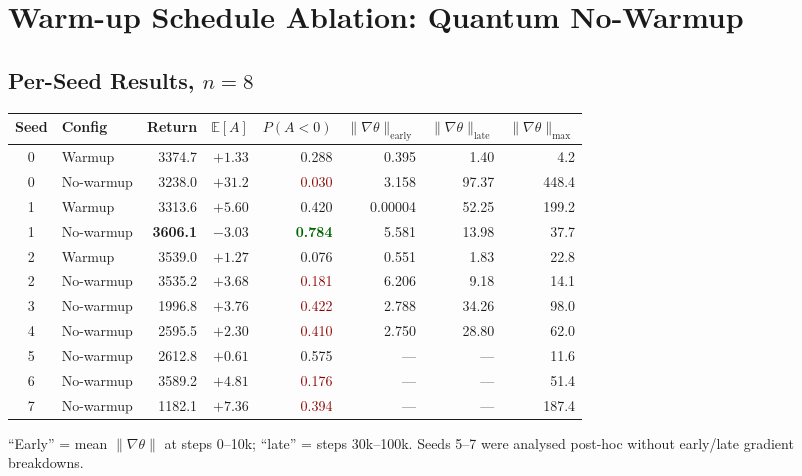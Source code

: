 \documentclass[10pt,a4paper]{article}
\begin{document}
\section{Warm-up Schedule Ablation: Quantum No-Warmup}

\subsection{Per-Seed Results, $n=8$}

\begin{center}
\setlength{\tabcolsep}{5pt}
\begin{tabular}{clrrrrrr}
\toprule
\textbf{Seed} & \textbf{Config} & \textbf{Return} & $\mathbb{E}[A]$
  & $P(A{<}0)$ & $\|\nabla\theta\|_\text{early}$
  & $\|\nabla\theta\|_\text{late}$ & $\|\nabla\theta\|_\text{max}$ \\
\midrule
0 & Warmup    & 3374.7 & $+1.33$ & 0.288
  & 0.395 &  1.40 &   4.2 \\
0 & No-warmup & 3238.0 & $+31.2$ & \textcolor{darkred}{0.030}
  & 3.158 & 97.37 & 448.4 \\
\midrule
1 & Warmup    & 3313.6 & $+5.60$ & 0.420
  & 0.00004 & 52.25 & 199.2 \\
1 & No-warmup & \textbf{3606.1} & $\mathbf{-3.03}$
  & \textcolor{darkgreen}{\textbf{0.784}}
  & 5.581 & 13.98 &  37.7 \\
\midrule
2 & Warmup    & 3539.0 & $+1.27$ & 0.076
  & 0.551 &  1.83 &  22.8 \\
2 & No-warmup & 3535.2 & $+3.68$ & \textcolor{darkred}{0.181}
  & 6.206 &  9.18 &  14.1 \\
\midrule
3 & No-warmup & 1996.8 & $+3.76$ & \textcolor{darkred}{0.422}
  & 2.788 & 34.26 &  98.0 \\
4 & No-warmup & 2595.5 & $+2.30$ & \textcolor{darkred}{0.410}
  & 2.750 & 28.80 &  62.0 \\
\midrule
5 & No-warmup & 2612.8 & $+0.61$ & 0.575
  & --- & --- &  11.6 \\
6 & No-warmup & 3589.2 & $+4.81$ & \textcolor{darkred}{0.176}
  & --- & --- &  51.4 \\
7 & No-warmup & 1182.1 & $+7.36$ & \textcolor{darkred}{0.394}
  & --- & --- & 187.4 \\
\bottomrule
\end{tabular}
\end{center}
\vspace{3pt}
``Early'' = mean $\|\nabla\theta\|$ at steps 0--10k; ``late'' = steps
30k--100k. Seeds 5--7 were analysed post-hoc without early/late gradient
breakdowns.
\end{document}
